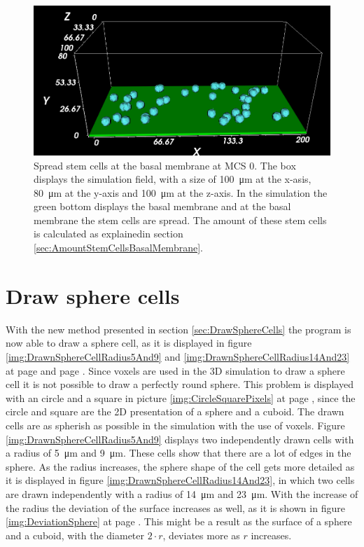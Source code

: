 \begin{figure}[ht]
	\center
	\includegraphics[scale=0.4]{figures/SimulationAtMCS0.png}
	\caption[Spread stem cells at the basal membrane at \ac{MCS} 0]{Spread stem cells at the basal membrane at \ac{MCS} 0. The box displays the simulation field, with a size of \SI{100}{\micro\metre} at the x-asis, \SI{80}{\micro\metre} at the y-axis and \SI{100}{\micro\metre} at the z-axis. In the simulation the green bottom displays the basal membrane and at the basal membrane the stem cells are spread. The amount of these stem cells is calculated as explainedin section \ref{sec:AmountStemCellsBasalMembrane}.}
	\label{img:SimulationAtMCS0}
\end{figure}


\section{Draw sphere cells}
With the new method presented in section \ref{sec:DrawSphereCells} the program is now able to draw a sphere cell, as it is displayed in figure \ref{img:DrawnSphereCellRadius5And9} and \ref{img:DrawnSphereCellRadius14And23} at page \pageref{img:DrawnSphereCellRadius5And9} and page \pageref{img:DrawnSphereCellRadius14And23}. \newline
Since voxels are used in the 3D simulation to draw a sphere cell it is not possible to draw a perfectly round sphere. This problem is displayed with an circle and a square in picture \ref{img:CircleSquarePixels} at page \pageref{img:CircleSquarePixels}, since the circle and square are the 2D presentation of a sphere and a cuboid. The drawn cells are as spherish as possible in the simulation with the use of voxels. \newline
Figure \ref{img:DrawnSphereCellRadius5And9} displays two independently drawn cells with a radius of \SI{5}{\micro\metre} and \SI{9}{\micro\metre}. These cells show that there are a lot of edges in the sphere. As the radius increases, the sphere shape of the cell gets more detailed as it is displayed in figure \ref{img:DrawnSphereCellRadius14And23}, in which two cells are drawn independently with a radius of \SI{14}{\micro\metre} and \SI{23}{\micro\metre}. With the increase of the radius the deviation of the surface increases as well, as it is shown in figure \ref{img:DeviationSphere} at page \pageref{img:DeviationSphere}. This might be a result as the surface of a sphere and a cuboid, with the diameter $2 \cdot r$, deviates more as $r$ increases.


